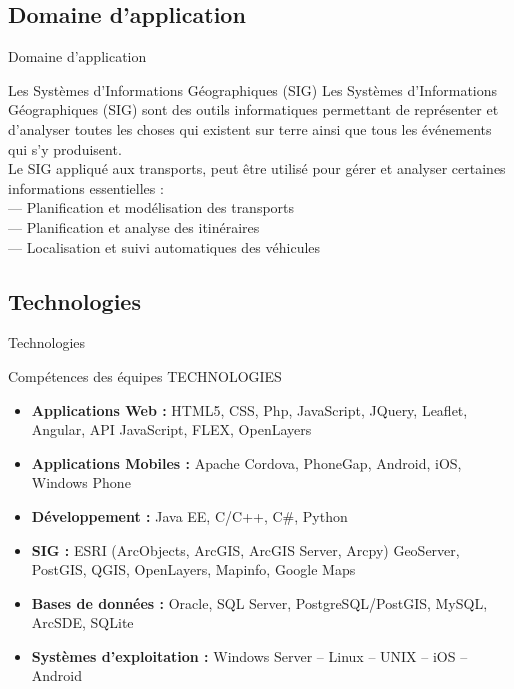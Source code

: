 \documentclass[utf8,compress]{beamer}
\begin{document}
\subsection{Domaine d'application}
\begin{frame}{Domaine d'application}
\begin{block}{Les Systèmes d’Informations Géographiques (SIG)}
Les Systèmes d’Informations Géographiques (SIG) sont des outils informatiques permettant
de représenter et d’analyser toutes les choses qui existent sur terre ainsi que tous les événements
qui s’y produisent. \\
Le SIG appliqué aux transports, peut être utilisé
pour gérer et analyser certaines informations essentielles :\\
— Planification et modélisation des transports\\
— Planification et analyse des itinéraires\\
— Localisation et suivi automatiques des véhicules\\
\end{block}
\end{frame}
\subsection{Technologies}
\begin{frame}{Technologies}
\begin{block}{Compétences des équipes}
TECHNOLOGIES
\begin{itemize}
\item \textbf{Applications Web :} HTML5, CSS, Php, JavaScript, JQuery, Leaflet, Angular, API JavaScript, FLEX, OpenLayers
\item \textbf{Applications Mobiles :} Apache Cordova, PhoneGap, Android, iOS, Windows Phone
\item \textbf{Développement :} Java EE, C/C++, C\#, Python
\item \textbf{SIG :} ESRI (ArcObjects, ArcGIS, ArcGIS Server, Arcpy) GeoServer, PostGIS, QGIS, OpenLayers, Mapinfo, Google Maps
\item \textbf{Bases de données :} Oracle, SQL Server, PostgreSQL/PostGIS, MySQL, ArcSDE, SQLite
\item \textbf{Systèmes d’exploitation :} Windows Server – Linux – UNIX – iOS – Android
\end{itemize}
\end{block}
\end{frame}

\end{document}
